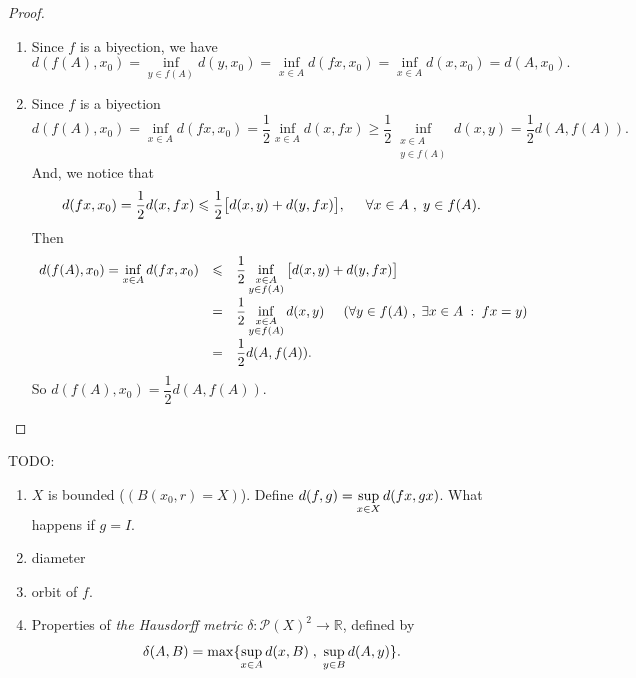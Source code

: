 \documentclass{amsart}
\begin{document}
\begin{proof}
	\begin{enumerate}
		\item {} Since \(f\) is a biyection, we have
			\[
				d(f(A) ,x_0) = \inf _{y \in f(A)} d(y,x_0) = \inf _{x \in A} d(fx,x_0) = \inf _{x \in A} d(x,x_0) = d(A,x_0). 
			\]
		\item {} Since \(f\) is a biyection
			\[
				d(f(A) ,x_0) = \inf _{x \in A} d(fx,x_0) = \dfrac{1}{2} \inf _{x \in A} d(x,fx) \geqslant \dfrac{1}{2} \inf _{\substack{x \in A \\ y \in f(A)}} d(x,y) = \dfrac{1}{2} d(A,f(A)).
			\]
			And, we notice that
			\[
				d(fx,x_0) = \dfrac{1}{2} d(x,fx) \leqslant \dfrac{1}{2} \big[d(x,y) + d(y,fx)\big], \hspace{5mm} \forall x \in A \;,\; y \in f(A).
			\]
			Then
			\[
				\begin{array}{rcl}
					d(f(A) ,x_0) = \displaystyle \inf _{x \in A} d(fx,x_0) & \leqslant & \dfrac{1}{2} \displaystyle \inf _{\substack{x \in A \\ y \in f(A)}} \big[d(x,y) + d(y,fx)\big] \\[5mm]
					& = & \dfrac{1}{2} \displaystyle \inf _{\substack{x \in A \\ y \in f(A)}} d(x,y) \hspace{5mm} (\forall y \in f(A) \;,\; \exists x \in A \;:\; fx = y)\\[5mm]
					& = & \dfrac{1}{2} d(A,f(A)).
				\end{array}
			\]
			So \(d(f(A) ,x_0) = \dfrac{1}{2} d(A,f(A))\).
	\end{enumerate}
\end{proof}
TODO:
\begin{enumerate}
	\item \(X\) is bounded (\((B(x_0,r) = X)\)). Define \(d(f,g) = \displaystyle \sup _{x \in X} d(fx,gx) \). What happens if \(g=I\).
	\item diameter
	\item orbit of \(f\).
	\item Properties of \textit{the Hausdorff metric} \(\delta : \mathscr{P} (X) ^2 \longrightarrow \mathbb{R} \), defined by
		\[
			\delta (A,B) = \max \{\displaystyle \sup _{x \in A} d(x,B) \;,\;  \displaystyle \sup _{y \in B} d(A,y)\}.
		\]
\end{enumerate}
\end{document}
